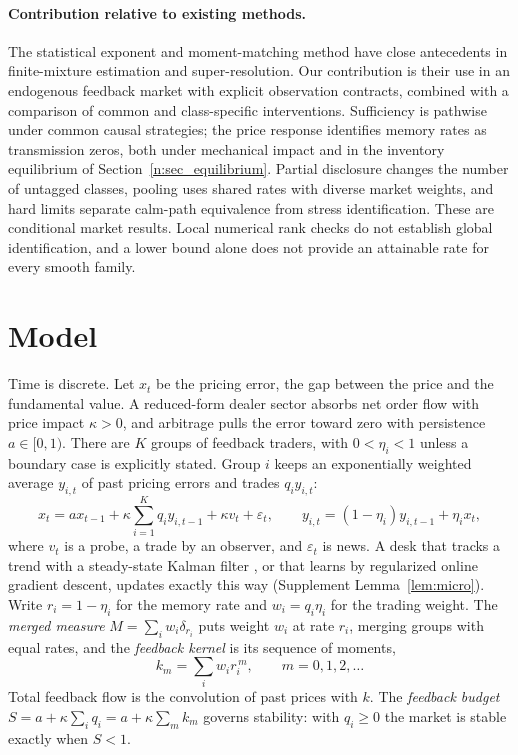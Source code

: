 \documentclass[12pt]{article}
\theoremstyle{definition}
\theoremstyle{remark}
\begin{document}
\paragraph{Contribution relative to existing methods.} The statistical exponent and moment-matching method have close antecedents in finite-mixture estimation and super-resolution. Our contribution is their use in an endogenous feedback market with explicit observation contracts, combined with a comparison of common and class-specific interventions. Sufficiency is pathwise under common causal strategies; the price response identifies memory rates as transmission zeros, both under mechanical impact and in the inventory equilibrium of Section~\ref{n:sec_equilibrium}. Partial disclosure changes the number of untagged classes, pooling uses shared rates with diverse market weights, and hard limits separate calm-path equivalence from stress identification. These are conditional market results. Local numerical rank checks do not establish global identification, and a lower bound alone does not provide an attainable rate for every smooth family.

\section{Model}\label{n:model}

Time is discrete. Let $x_t$ be the pricing error, the gap between the price and the fundamental value. A reduced-form dealer sector absorbs net order flow with price impact $\kappa>0$, and arbitrage pulls the error toward zero with persistence $a\in[0,1)$. There are $K$ groups of feedback traders, with $0<\eta_i<1$ unless a boundary case is explicitly stated. Group $i$ keeps an exponentially weighted average $y_{i,t}$ of past pricing errors and trades $q_iy_{i,t}$:
\begin{equation}\label{n:eq:model}
x_t=ax_{t-1}+\kappa\sum_{i=1}^Kq_iy_{i,t-1}+\kappa v_t+\varepsilon_t,\qquad y_{i,t}=(1-\eta_i)y_{i,t-1}+\eta_ix_t,
\end{equation}
where $v_t$ is a probe, a trade by an observer, and $\varepsilon_t$ is news. A desk that tracks a trend with a steady-state Kalman filter \citep{muth1960}, or that learns by regularized online gradient descent, updates exactly this way (Supplement Lemma~\ref{lem:micro}). Write $r_i=1-\eta_i$ for the memory rate and $w_i=q_i\eta_i$ for the trading weight. The \emph{merged measure} $M=\sum_iw_i\delta_{r_i}$ puts weight $w_i$ at rate $r_i$, merging groups with equal rates, and the \emph{feedback kernel} is its sequence of moments,
\[
k_m=\sum_iw_ir_i^{\,m},\qquad m=0,1,2,\ldots
\]
Total feedback flow is the convolution of past prices with $k$. The \emph{feedback budget} $S=a+\kappa\sum_iq_i=a+\kappa\sum_mk_m$ governs stability: with $q_i\ge0$ the market is stable exactly when $S<1$.
\end{document}
